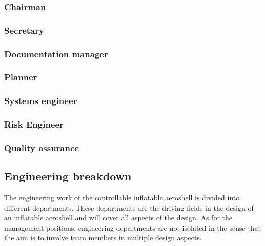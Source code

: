 \subsubsection{Chairman}\label{subsec:Chairman}


\subsubsection{Secretary}\label{subsec:Secretary}


\subsubsection{Documentation manager}\label{subsec:D_and_A}


\subsubsection{Planner}\label{subsec:Planner}


\subsubsection{Systems engineer}\label{subsec:SE}


\subsubsection{Risk Engineer}\label{subsec:RiskEng}


\subsubsection{Quality assurance}\label{subsec:QA}


\subsection{Engineering breakdown}\label{subsec:engineer}
The engineering work of the controllable inflatable aeroshell is divided into different departments. These departments are the driving fields in the design of an inflatable aeroshell and will cover all aspects of the design. As for the management positions, engineering departments are not isolated in the sense that the aim is to involve team members in multiple design aspects.

